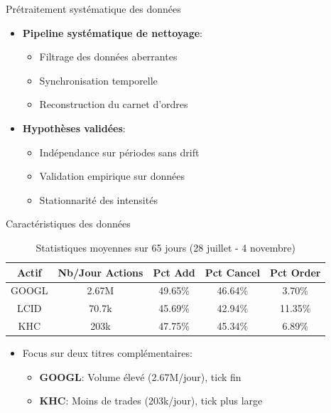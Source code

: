 \documentclass[aspectratio=169]{beamer}  %
\begin{document}
\begin{frame}{Prétraitement systématique des données}
    \begin{itemize}
        \item \textbf{Pipeline systématique de nettoyage}:
        \begin{itemize}
            \item Filtrage des données aberrantes
            \item Synchronisation temporelle
            \item Reconstruction du carnet d'ordres
        \end{itemize}
        \item \textbf{Hypothèses validées}:
        \begin{itemize}
            \item Indépendance sur périodes sans drift
            \item Validation empirique sur données
            \item Stationnarité des intensités
        \end{itemize}
    \end{itemize}
\end{frame}


\begin{frame}{Caractéristiques des données}
    \begin{table}
    \centering
    \begin{tabular}{|c|c|c|c|c|}
    \hline
    \textbf{Actif} & \textbf{Nb/Jour Actions} & \textbf{Pct Add} & \textbf{Pct Cancel} & \textbf{Pct Order} \\ \hline
    GOOGL & 2.67M & 49.65\% & 46.64\% & 3.70\% \\ \hline
    LCID & 70.7k & 45.69\% & 42.94\% & 11.35\% \\ \hline
    KHC & 203k & 47.75\% & 45.34\% & 6.89\% \\ \hline
    \end{tabular}
    \caption{Statistiques moyennes sur 65 jours (28 juillet - 4 novembre)}
    \end{table}
    \vspace{0.5cm}
    \begin{itemize}
        \item Focus sur deux titres complémentaires:
        \begin{itemize}
            \item \textbf{GOOGL}: Volume élevé (2.67M/jour), tick fin
            \item \textbf{KHC}: Moins de trades (203k/jour), tick plus large
        \end{itemize}
    \end{itemize}
\end{frame}
\end{document}
